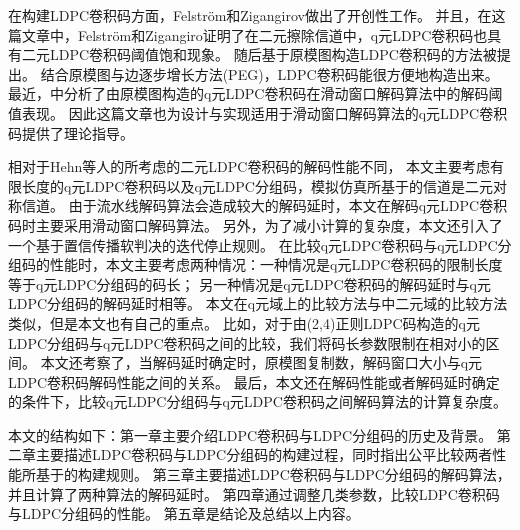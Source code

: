 在构建LDPC卷积码方面，Felström和Zigangirov做出了开创性工作\parencite{782171}。
并且，在这篇文章中，Felström和Zigangiro证明了在二元擦除信道中，q元LDPC卷积码也具有二元LDPC卷积码阈值饱和现象。
随后基于原模图\parencite{Thorpe2003Low}构造LDPC卷积码的方法被提出。
结合原模图与边逐步增长方法(PEG)\parencite{1377521}，LDPC卷积码能很方便地构造出来。
最近，\parencite{6874959}中分析了由原模图构造的q元LDPC卷积码在滑动窗口解码算法中的解码阈值表现。
因此这篇文章也为设计与实现适用于滑动窗口解码算法的q元LDPC卷积码提供了理论指导。

相对于Hehn等人的\parencite{5089507}所考虑的二元LDPC卷积码的解码性能不同，
本文主要考虑有限长度的q元LDPC卷积码以及q元LDPC分组码，模拟仿真所基于的信道是二元对称信道。
由于流水线解码算法会造成较大的解码延时，本文在解码q元LDPC卷积码时主要采用滑动窗口解码算法。
另外，为了减小计算的复杂度，本文还引入了一个基于置信传播软判决的迭代停止规则。
在比较q元LDPC卷积码与q元LDPC分组码的性能时，本文主要考虑两种情况：一种情况是q元LDPC卷积码的限制长度等于q元LDPC分组码的码长；
另一种情况是q元LDPC卷积码的解码延时与q元LDPC分组码的解码延时相等。
本文在q元域上的比较方法与\parencite{5089507}中二元域的比较方法类似，但是本文也有自己的重点。
比如，对于由(2,4)正则LDPC码构造的q元LDPC分组码与q元LDPC卷积码之间的比较，我们将码长参数限制在相对小的区间。
本文还考察了，当解码延时确定时，原模图复制数，解码窗口大小与q元LDPC卷积码解码性能之间的关系。
最后，本文还在解码性能或者解码延时确定的条件下，比较q元LDPC分组码与q元LDPC卷积码之间解码算法的计算复杂度。

本文的结构如下：第一章主要介绍LDPC卷积码与LDPC分组码的历史及背景。
第二章主要描述LDPC卷积码与LDPC分组码的构建过程，同时指出公平比较两者性能所基于的构建规则。
第三章主要描述LDPC卷积码与LDPC分组码的解码算法，并且计算了两种算法的解码延时。
第四章通过调整几类参数，比较LDPC卷积码与LDPC分组码的性能。
第五章是结论及总结以上内容。